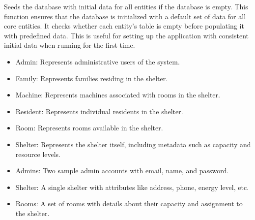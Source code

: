 \documentclass[letterpaper,10pt,english]{sphinxmanual}
\begin{document}
\begin{fulllineitems}
\label{\detokenize{app.mysql:app.mysql.initializeData.initialize_database}}
\pysigstartsignatures
\pysiglinewithargsret
{}
{}
{}
\pysigstopsignatures
\sphinxAtStartPar
Seeds the database with initial data for all entities if the database is empty.
This function ensures that the database is initialized with a default set of data
for all core entities. It checks whether each entity’s table is empty before
populating it with predefined data. This is useful for setting up the application
with consistent initial data when running for the first time.
\begin{description}
\begin{itemize}
\item {} 
\sphinxAtStartPar
Admin: Represents administrative users of the system.

\item {} 
\sphinxAtStartPar
Family: Represents families residing in the shelter.

\item {} 
\sphinxAtStartPar
Machine: Represents machines associated with rooms in the shelter.

\item {} 
\sphinxAtStartPar
Resident: Represents individual residents in the shelter.

\item {} 
\sphinxAtStartPar
Room: Represents rooms available in the shelter.

\item {} 
\sphinxAtStartPar
Shelter: Represents the shelter itself, including metadata such as capacity
and resource levels.

\end{itemize}

\begin{itemize}
\item {} 
\sphinxAtStartPar
Admins: Two sample admin accounts with email, name, and password.

\item {} 
\sphinxAtStartPar
Shelter: A single shelter with attributes like address, phone, energy level, etc.

\item {} 
\sphinxAtStartPar
Rooms: A set of rooms with details about their capacity and assignment to the shelter.


\end{itemize}
\end{description}
\end{fulllineitems}
\end{document}
